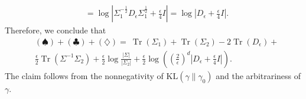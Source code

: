 \documentclass[letterpaper, 10 pt, conference]{ieeeconf}  %
\makeatletter
\renewenvironment{proof}[1][\proofname]{\par
  \pushQED{\qed}%
  \normalfont \topsep\z@
  \trivlist
  \item[\hskip2em
        \itshape
    #1\@addpunct{:}]\ignorespaces
}{%
  \popQED\endtrivlist\@endpefalse
}
\theoremstyle{ieeeconf}
\DeclareMathOperator{\Tr}{Tr}
\makeatother
\begin{document}
\begin{proof}
\begin{align*}
  \\
  &=\log|\Sigma_1^{-\frac{1}{2}}D_\epsilon\Sigma_1^{\frac{1}{2}} + \tfrac{\epsilon}{4}I| = \log|D_\epsilon+ \tfrac{\epsilon}{4}I|.
\end{align*}
Therefore, we conclude that
\begin{align*}
&(\spadesuit) + (\clubsuit) + (\diamondsuit) =\ 
\Tr(\Sigma_1) + \Tr(\Sigma_2) - 2\Tr(D_\epsilon)+
\\
&\frac{\epsilon}{2}\Tr(\Sigma^{-1}\Sigma_2) + \frac{\epsilon}{2}\log\frac{|\Sigma|}{|\Sigma_2|} + \frac{\epsilon}{2}\log\!\left(\left(\frac{2}{\epsilon}\right)^d
\left|D_\epsilon + \frac{\epsilon}{4}I\right|\right).
\end{align*}
The claim follows from the nonnegativity of $\mathrm{KL}(\gamma\|\gamma_0)$ and the arbitrariness of $\gamma$.
\end{proof}
\end{document}

